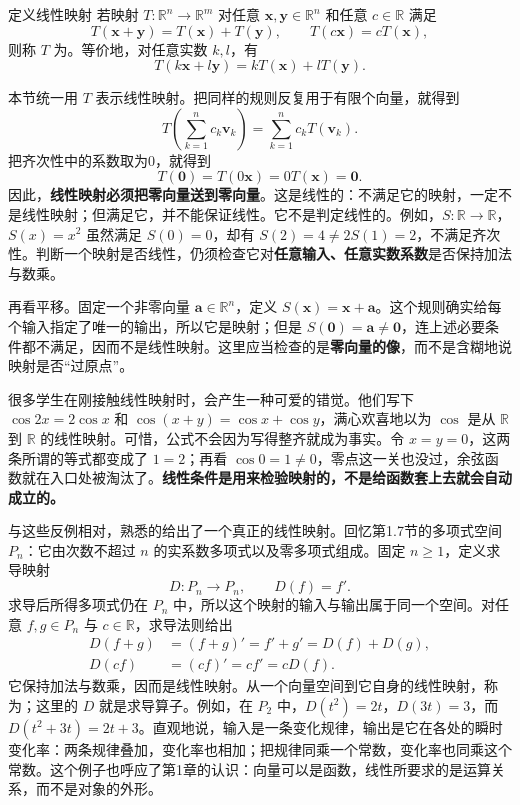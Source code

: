 \documentclass[a4paper,12pt,twoside,openany,fontset=none]{ctexbook}
\renewcommand{\ge}{\geqslant}
\let\oldsum\sum
\renewcommand{\sum}{\displaystyle\oldsum}
\newcounter{definition}[chapter]
\newenvironment{definition}[1][]{\begin{defBox}{定义}{#1}}{\end{defBox}}
\numberwithin{equation}{chapter}
\begin{document}
\begin{definition}[线性映射]
若映射 $T:\mathbb R^n\to\mathbb R^m$ 对任意 $\boldsymbol x,\boldsymbol y\in\mathbb R^n$ 和任意 $c\in\mathbb R$ 满足
\[
 T(\boldsymbol x+\boldsymbol y)=T(\boldsymbol x)+T(\boldsymbol y),
 \qquad T(c\boldsymbol x)=cT(\boldsymbol x),
\]
则称 $T$ 为\textbf{}。等价地，对任意实数 $k,l$，有
\[
 T(k\boldsymbol x+l\boldsymbol y)=kT(\boldsymbol x)+lT(\boldsymbol y).
\]
\end{definition}

本节统一用 $T$ 表示线性映射。把同样的规则反复用于有限个向量，就得到
\[
 T\!\left(\sum_{k=1}^n c_k\boldsymbol v_k\right)
 =\sum_{k=1}^n c_k T(\boldsymbol v_k).
\]
把齐次性中的系数取为0，就得到
\begin{equation*}
 T(\boldsymbol0)=T(0\boldsymbol x)=0T(\boldsymbol x)=\boldsymbol0.
\end{equation*}
因此，\textbf{线性映射必须把零向量送到零向量}。这是线性的：不满足它的映射，一定不是线性映射；但满足它，并不能保证线性。它不是判定线性的。例如，$S:\mathbb R\to\mathbb R$，$S(x)=x^2$ 虽然满足 $S(0)=0$，却有 $S(2)=4\ne2S(1)=2$，不满足齐次性。判断一个映射是否线性，仍须检查它对\textbf{任意输入、任意实数系数}是否保持加法与数乘。

再看平移。固定一个非零向量 $\boldsymbol a\in\mathbb R^n$，定义 $S(\boldsymbol x)=\boldsymbol x+\boldsymbol a$。这个规则确实给每个输入指定了唯一的输出，所以它是映射；但是 $S(\boldsymbol0)=\boldsymbol a\ne\boldsymbol0$，连上述必要条件都不满足，因而不是线性映射。这里应当检查的是\textbf{零向量的像}，而不是含糊地说映射是否“过原点”。

很多学生在刚接触线性映射时，会产生一种可爱的错觉。他们写下 $\cos 2x=2\cos x$ 和 $\cos(x+y)=\cos x+\cos y$，满心欢喜地以为 $\cos$ 是从 $\mathbb R$ 到 $\mathbb R$ 的线性映射。可惜，公式不会因为写得整齐就成为事实。令 $x=y=0$，这两条所谓的等式都变成了 $1=2$；再看 $\cos0=1\ne0$，零点这一关也没过，余弦函数就在入口处被淘汰了。\textbf{线性条件是用来检验映射的，不是给函数套上去就会自动成立的。}

与这些反例相对，熟悉的给出了一个真正的线性映射。回忆第1.7节的多项式空间 $P_n$：它由次数不超过 $n$ 的实系数多项式以及零多项式组成。固定 $n\ge1$，定义求导映射
\begin{equation*}
 D:P_n\longrightarrow P_n,\qquad D(f)=f'.
\end{equation*}
求导后所得多项式仍在 $P_n$ 中，所以这个映射的输入与输出属于同一个空间。对任意 $f,g\in P_n$ 与 $c\in\mathbb R$，求导法则给出
\begin{align*}
 D(f+g)&=(f+g)'=f'+g'=D(f)+D(g),\\
 D(cf)&=(cf)'=cf'=cD(f).
\end{align*}
它保持加法与数乘，因而是线性映射。从一个向量空间到它自身的线性映射，称为；这里的 $D$ 就是求导算子。例如，在 $P_2$ 中，$D(t^2)=2t$，$D(3t)=3$，而 $D(t^2+3t)=2t+3$。直观地说，输入是一条变化规律，输出是它在各处的瞬时变化率：两条规律叠加，变化率也相加；把规律同乘一个常数，变化率也同乘这个常数。这个例子也呼应了第1章的认识：向量可以是函数，线性所要求的是运算关系，而不是对象的外形。
\end{document}
